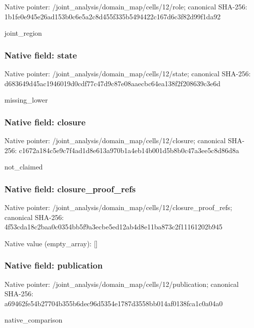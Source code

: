 \documentclass[10pt,a4paper]{article}
\begin{document}
Native pointer: /joint\_analysis/domain\_m\allowbreak{}ap/cells/12/role; canonical SHA-256: 1b1fe0e945e26ad153b0c6e5\allowbreak{}a2c8d455f335b5494422c167\allowbreak{}d6c3f82d99f1da92


joint\_region


\subsubsection{Native field: state}


Native pointer: /joint\_analysis/domain\_m\allowbreak{}ap/cells/12/state; canonical SHA-256: d683649d45ac1946019d0cdf\allowbreak{}77c47d9c87e08aaecbc64ea1\allowbreak{}38f2f208639c3e6d


missing\_lower


\subsubsection{Native field: closure}


Native pointer: /joint\_analysis/domain\_m\allowbreak{}ap/cells/12/closure; canonical SHA-256: c1672a184c5e9c7f4ad1d8e6\allowbreak{}13a970b1a4eb14b001d5b8b0\allowbreak{}c47a3ee5c8d86d8a


not\_claimed


\subsubsection{Native field: closure\_proof\_refs}


Native pointer: /joint\_analysis/domain\_m\allowbreak{}ap/cells/12/closure\_proo\allowbreak{}f\_refs; canonical SHA-256: 4f53cda18c2baa0c0354bb5f\allowbreak{}9a3ecbe5ed12ab4d8e11ba87\allowbreak{}3c2f11161202b945



Native value (empty\_array): []



\subsubsection{Native field: publication}


Native pointer: /joint\_analysis/domain\_m\allowbreak{}ap/cells/12/publication; canonical SHA-256: a69462fe54b27704b355b6de\allowbreak{}c96d5354e1787d3558bb014a\allowbreak{}f0138fca1c0a04a0


native\_comparison
\end{document}
